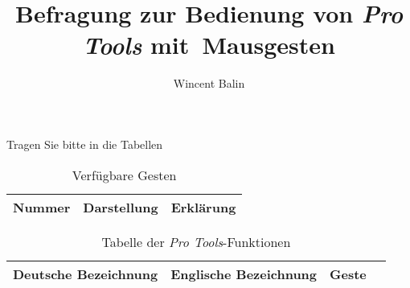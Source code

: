 \documentclass[11pt,a4paper,notitlepage]{article}
\author{Wincent Balin}
\title{Befragung zur Bedienung von \emph{Pro Tools} mit~Mausgesten}
\begin{document}
\maketitle

Tragen Sie bitte in die Tabellen 

\begin{table}[ht] \label{tab:Gestures}
\centering
\begin{tabular}{|l|l|l|} \hline
Nummer & Darstellung & Erklärung \\ \hline \hline
\end{tabular}
\caption{Verfügbare Gesten}
\end{table}

\begin{table}[ht] \label{tab:Functions}
\centering
\begin{tabular}{|l|l|l|l|} \hline
Deutsche Bezeichnung & Englische Bezeichnung & Geste & \\ \hline \hline
\end{tabular}
\caption{Tabelle der \emph{Pro Tools}-Funktionen}
\end{table}
\end{document}
